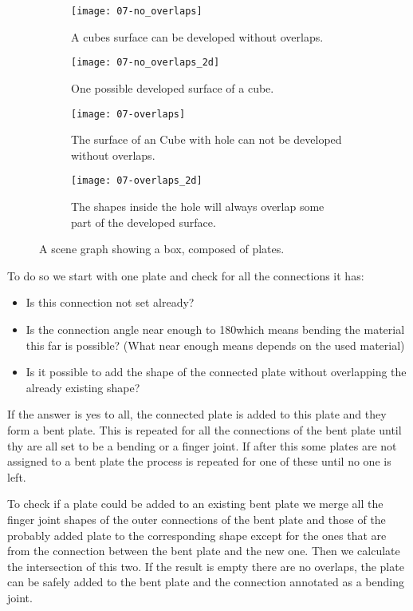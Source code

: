 \documentclass[../ClassicThesis.tex]{subfiles}
\begin{document}
\begin{figure}[h]
  \centering
  \begin{subfigure}[b]{0.49\textwidth}
    \centering
    \texttt{[image: 07-no\_overlaps]}
    \caption{A cubes surface can be developed without overlaps.}
    \label{fig:overlaps:no-3d}
  \end{subfigure}
  \begin{subfigure}[b]{0.49\textwidth}
    \centering
    \texttt{[image: 07-no\_overlaps\_2d]}
    \caption{One possible developed surface of a cube.}
    \label{fig:overlapsh:no-2d}
  \end{subfigure}
  \begin{subfigure}[b]{0.49\textwidth}
    \centering
    \texttt{[image: 07-overlaps]}
    \caption{The surface of an Cube with hole can not be developed without overlaps.}
    \label{fig:overlaps:some-3d}
  \end{subfigure}
  \begin{subfigure}[b]{0.49\textwidth}
    \centering
    \texttt{[image: 07-overlaps\_2d]}
    \caption{The shapes inside the hole will always overlap some part of the developed surface.}
    \label{fig:overlaps:some-2d}
  \end{subfigure}
  \caption{A scene graph showing a box, composed of plates.}
  \label{fig:overlaps}
\end{figure}

To do so we start with one plate and check for all the connections it has:
\begin{itemize}
\item Is this connection not set already?
\item Is the connection angle near enough to 180\textdegree which means bending the material this far is possible? (What near enough means depends on the used material)
\item Is it possible to add the shape of the connected plate without overlapping the already existing shape?
\end{itemize}
If the answer is yes to all, the connected plate is added to this plate and they form a bent plate. This is repeated for all the connections of the bent plate until thy are all set to be a bending or a finger joint.
If after this some plates are not assigned to a bent plate the process is repeated for one of these until no one is left.

To check if a plate could be added to an existing bent plate we merge all the finger joint shapes of the outer connections of the bent plate and those of the probably added plate to the corresponding shape except for the ones that are from the connection between the bent plate and the new one. Then we calculate the intersection of this two. If the result is empty there are no overlaps, the plate can be safely added to the bent plate and the connection annotated as a bending joint.
\end{document}
